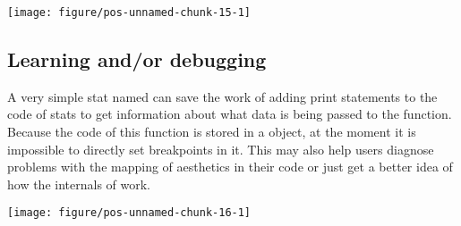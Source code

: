 \documentclass[paper=a4,10pt,div=17,headsepline,BCOR=12mm,twoside,open=right]{scrbook}\usepackage{knitr}
\begin{document}
\begin{knitrout}\footnotesize
{}\color{fgcolor}\begin{kframe}
\begin{alltt}
  \hlopt{+}
  \hlstd{(} \hlstd{=} \hlstd{)} \hlopt{+} \hlstd{(} \hlstd{=} \hlstd{)}
\end{alltt}
\end{kframe}

{\centering \texttt{[image: figure/pos-unnamed-chunk-15-1]} 

}



\end{knitrout}

\subsection{Learning and/or debugging}

A very simple stat named  can save the work of adding print statements to the code of stats to get information about what data is being passed to the  function. Because the code of this function is stored in a  object, at the moment it is impossible to directly set breakpoints in it. This  may also help users diagnose problems with the mapping of aesthetics in their code or just get a better idea of how the internals of \ggplot work.

\begin{knitrout}\footnotesize
{}\color{fgcolor}\begin{kframe}
\begin{alltt}
  \hlopt{+} \hlstd{()} \hlopt{+}
  \hlstd{(} \hlstd{=} \hlstd{)}
\end{alltt}
\end{kframe}

{\centering \texttt{[image: figure/pos-unnamed-chunk-16-1]} 

}



\end{knitrout}
\end{document}
